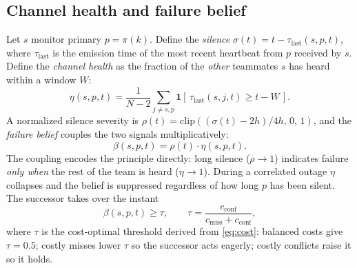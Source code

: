 \documentclass[conference]{IEEEtran}
\begin{document}
\subsection{Channel health and failure belief}
Let $s$ monitor primary $p=\pi(k)$. Define the \emph{silence}
$\sigma(t)=t-\tau_{\text{last}}(s,p,t)$, where $\tau_{\text{last}}$ is the
emission time of the most recent heartbeat from $p$ received by $s$. Define the
\emph{channel health} as the fraction of the \emph{other} teammates $s$ has
heard within a window $W$:
\begin{equation}
\eta(s,p,t) = \frac{1}{N-2}\!\!\sum_{j\neq s,p}\!\!
\mathbf{1}\!\left[\,\tau_{\text{last}}(s,j,t) \ge t-W\,\right].
\label{eq:health}
\end{equation}
A normalized silence severity is
$\rho(t)=\mathrm{clip}\!\left((\sigma(t)-2h)/4h,\,0,\,1\right)$, and the
\emph{failure belief} couples the two signals multiplicatively:
\begin{equation}
\beta(s,p,t) = \rho(t)\cdot \eta(s,p,t).
\label{eq:belief}
\end{equation}
The coupling encodes the principle directly: long silence ($\rho\!\to\!1$)
indicates failure \emph{only when} the rest of the team is heard
($\eta\!\to\!1$). During a correlated outage $\eta$ collapses and the belief is
suppressed regardless of how long $p$ has been silent. The successor takes over
the instant
\begin{equation}
\beta(s,p,t) \ge \tau, \qquad
\tau = \frac{c_{\text{conf}}}{c_{\text{miss}}+c_{\text{conf}}},
\label{eq:thresh}
\end{equation}
where $\tau$ is the cost-optimal threshold derived from
\eqref{eq:cost}: balanced costs give $\tau=0.5$; costly misses lower $\tau$ so
the successor acts eagerly; costly conflicts raise it so it holds.
\end{document}
